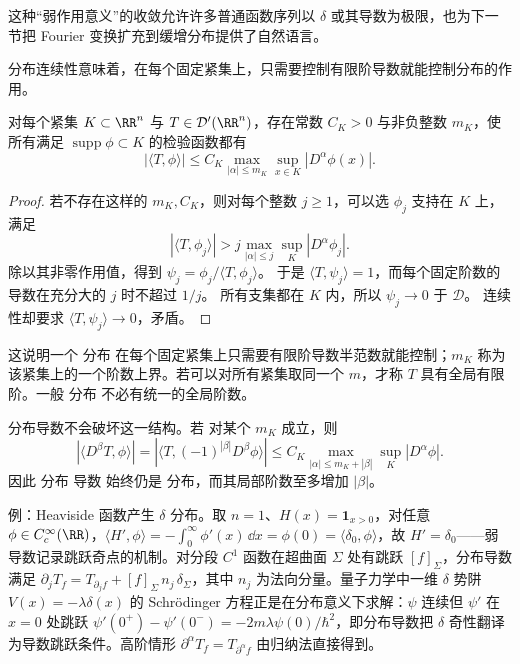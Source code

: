 这种``弱作用意义''的收敛允许许多普通函数序列以 $\delta$ 或其导数为极限，也为下一节把 Fourier 变换扩充到缓增分布提供了自然语言。

分布连续性意味着，在每个固定紧集上，只需要控制有限阶导数就能控制分布的作用。

\begin{proposition}[分布在固定紧集上的有限阶估计]
对每个紧集 $K\subset\RR^n$ 与 $T\in\mathcal D'(\RR^n)$，存在常数 $C_K>0$ 与非负整数 $m_K$，使所有满足 $\operatorname{supp}\phi\subset K$ 的检验函数都有
\begin{equation}
|\langle T,\phi\rangle|
\le
C_K
\max_{|\alpha|\le m_K}
\sup_{x\in K}|D^\alpha\phi(x)|.
\label{eq:distribution-local-order-bound}
\end{equation}
\end{proposition}
\begin{proof}
若不存在这样的 $m_K,C_K$，则对每个整数 $j\ge1$，可以选 $\phi_j$ 支持在 $K$ 上，满足
\[
|\langle T,\phi_j\rangle|>j\max_{|\alpha|\le j}\sup_K|D^\alpha\phi_j|.
\]
除以其非零作用值，得到 $\psi_j=\phi_j/\langle T,\phi_j\rangle$。
于是 $\langle T,\psi_j\rangle=1$，而每个固定阶数的导数在充分大的 $j$ 时不超过 $1/j$。
所有支集都在 $K$ 内，所以 $\psi_j\to0$ 于 $\mathcal D$。
连续性却要求 $\langle T,\psi_j\rangle\to0$，矛盾。
\end{proof}
这说明一个 分布 在每个固定紧集上只需要有限阶导数半范数就能控制；$m_K$ 称为该紧集上的一个阶数上界。若可以对所有紧集取同一个 $m$，才称 $T$ 具有全局有限阶。一般 分布 不必有统一的全局阶数。

分布导数不会破坏这一结构。若 对某个 $m_K$ 成立，则
\[
|\langle D^\beta T,\phi\rangle|
=
|\langle T,(-1)^{|\beta|}D^\beta\phi\rangle|
\le
C_K
\max_{|\alpha|\le m_K+|\beta|}
\sup_K|D^\alpha\phi|.
\]
因此 分布 导数 始终仍是 分布，而其局部阶数至多增加 $|\beta|$。

例：Heaviside 函数产生 $\delta$ 分布。取 $n=1$、$H(x)=\mathbf 1_{x>0}$，对任意 $\phi\in C_c^\infty(\RR)$，$\langle H',\phi\rangle=-\int_0^\infty\phi'(x)\,\dd x=\phi(0)=\langle\delta_0,\phi\rangle$，故 $H'=\delta_0$——弱导数记录跳跃奇点的机制。对分段 $C^1$ 函数在超曲面 $\Sigma$ 处有跳跃 $[f]_\Sigma$，分布导数满足 $\partial_jT_f=T_{\partial_jf}+[f]_\Sigma\,n_j\,\delta_\Sigma$，其中 $n_j$ 为法向分量。量子力学中一维 $\delta$ 势阱 $V(x)=-\lambda\delta(x)$ 的 Schrödinger 方程正是在分布意义下求解：$\psi$ 连续但 $\psi'$ 在 $x=0$ 处跳跃 $\psi'(0^+)-\psi'(0^-)=-2m\lambda\psi(0)/\hbar^2$，即分布导数把 $\delta$ 奇性翻译为导数跳跃条件。高阶情形 $\partial^\alpha T_f=T_{\partial^\alpha f}$ 由归纳法直接得到。

